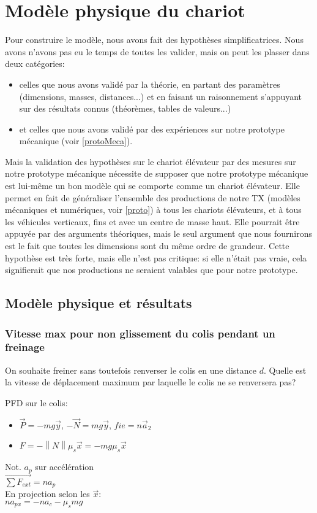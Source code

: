 \section{Modèle physique du chariot}
\label{meca}
Pour construire le modèle, nous avons fait des hypothèses simplificatrices. Nous avons n'avons pas eu le temps de toutes les valider, mais on peut les plasser dans deux catégories:
\begin{itemize}
	\item celles que nous avons validé par la théorie, en partant des paramètres (dimensions, masses, distances...) et en faisant un raisonnement s'appuyant sur des résultats connus (théorèmes, tables de valeurs...)
	\item et celles que nous avons validé par des expériences sur notre prototype mécanique (voir \ref{protoMeca}).
\end{itemize}
\label{hypProtoCommeChariot}
Mais la validation des hypothèses sur le chariot élévateur par des mesures sur notre prototype mécanique nécessite de supposer que notre prototype mécanique est lui-même un bon modèle qui se comporte comme un chariot élévateur. Elle permet en fait de généraliser l'ensemble des productions de notre TX (modèles mécaniques et numériques, voir \ref{proto}) à tous les chariots élévateurs, et à tous les véhicules verticaux, fins et avec un centre de masse haut. Elle pourrait être appuyée par des arguments théoriques, mais le seul argument que nous fournirons est le fait que toutes les dimensions sont du même ordre de grandeur. Cette hypothèse est très forte, mais elle n'est pas critique: si elle n'était pas vraie, cela signifierait que nos productions ne seraient valables que pour notre prototype.
\subsection{Modèle physique et résultats}

\subsubsection{Vitesse max pour non glissement du colis pendant un freinage}
On souhaite freiner sans toutefois renverser le colis en une distance $d$. Quelle est la vitesse de déplacement maximum par laquelle le colis ne se renversera pas?

PFD sur le colis:\\
\begin{itemize}
	\item $\vec P = -mg\vec y$, $-\vec N = mg \vec y$, $fie=n{\vec a_2}$
	\item $F = - \left\| N \right\| \mu_s\vec x = -mg\mu_s\vec x$
\end{itemize}
Not. $a_p$ sur accélération\\
$\vec{\sum F_{ext}} = na_p$\\
En projection selon les $\vec x$:\\
$na_{px} = -na_c - \mu_s mg$

